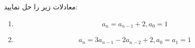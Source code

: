     \p 
معادلات زیر را حل نمایید:
\begin{enumerate}
\item
$$a_n = a_{n-1} + 2, a_0 = 1$$
\item
$$a_n = 3a_{n-1} - 2a_{n-2} + 2, a_0 = a_1 = 1$$
\end{enumerate}